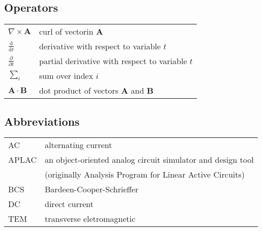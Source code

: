\documentclass[english,12pt,a4paper,pdftex,sci,utf8]{aaltothesis}
\begin{document}
\subsection*{Operators}

\begin{tabular}{ll}
$\nabla \times \mathbf{A}$              & curl of vectorin $\mathbf{A}$\\
$\displaystyle\frac{\mbox{d}}{\mbox{d} t}$ & derivative with respect to
variable $t$\\[3mm]
$\displaystyle\frac{\partial}{\partial t}$  & partial derivative with respect
to variable $t$ \\[3mm]
$\sum_i $                       & sum over index $i$\\
$\mathbf{A} \cdot \mathbf{B}$    & dot product of vectors $\mathbf{A}$ and
$\mathbf{B}$
\end{tabular}

\subsection*{Abbreviations}

\begin{tabular}{ll}
AC         & alternating current \\
APLAC      & an object-oriented analog circuit simulator and design tool \\
           & (originally Analysis Program for Linear Active Circuits) \\
BCS        & Bardeen-Cooper-Schrieffer \\ %
DC         & direct current \\
TEM        & transverse eletromagnetic
\end{tabular}


\cleardoublepage
\storeinipagenumber
{}
\setcounter{page}{1}


\end{document}
